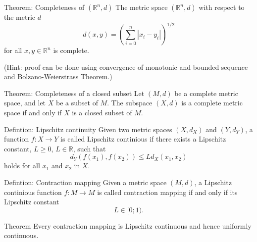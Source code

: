 \documentclass[10pt]{beamer}
\begin{document}
\begin{frame}
	\begin{block}{Theorem: Completeness of \((\mathbb{R}^n, d)\)}
		The metric space \((\mathbb{R}^n, d)\) with respect to the metric \(d\)
		\[d(x, y) = \left( \sum^n_{i=0} |x_i - y_i| \right)^{1/2}\]
		for all \(x, y \in \mathbb{R}^n\) is complete.
	\end{block}
	(Hint: proof can be done using convergence of monotonic and bounded sequence and
	Bolzano-Weierstrass Theorem.)
\end{frame}

\begin{frame}
	\begin{block}{Theorem: Completeness of a closed subset}
		Let \((M, d)\) be a complete metric space, and let \(X\) be a subset of \(M\). The subspace \((X, d)\) is a complete metric space if and only if \(X\) is a closed subset of \(M\).
	\end{block}
\end{frame}

\begin{frame}
	\begin{block}{Defintion: Lipschitz continuity}
		Given two metric spaces \((X, d_X)\) and \((Y, d_Y)\), a function \(f: X \rightarrow Y\) is called
		Lipschitz continious if there exists a Lipschitz constant, \(L \ge 0\), \(L \in \mathbb{R}\), such that
		\[d_Y(f(x_1), f(x_2)) \le Ld_X(x_1, x_2)\]
		holds for all \(x_1\) and \(x_2\) in \(X\).
	\end{block}

	\begin{block}{Defintion: Contraction mapping}
		Given a metric space \((M, d)\), a Lipschitz continious function \(f: M \rightarrow M\) is called
		contraction mapping if and only if its Lipschitz constant
		\[L \in [0;1).\]
	\end{block}
\end{frame}

\begin{frame}
	\begin{block}{Theorem}
		Every contraction mapping is Lipschitz continuous and hence uniformly continuous.
	\end{block}
\end{frame}
\end{document}
